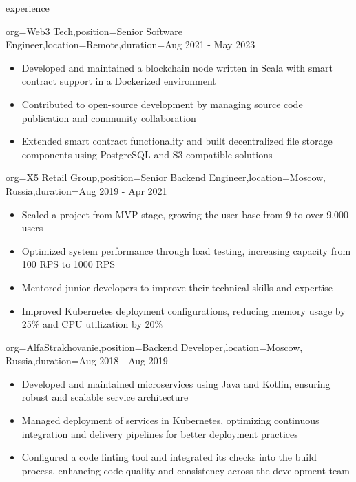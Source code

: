 \documentclass{resume}
\begin{document}
\begin{ResumeSection}{experience}
    \begin{ResumeSubsection}{org=Web3 Tech,position=Senior Software Engineer,location=Remote,duration=Aug 2021 - May 2023}
    \begin{itemize}
        \item Developed and maintained a blockchain node written in Scala with smart contract support in a Dockerized environment
        \item Contributed to open-source development by managing source code publication and community collaboration
        \item Extended smart contract functionality and built decentralized file storage components using PostgreSQL and S3-compatible solutions
    \end{itemize}
\end{ResumeSubsection}

\begin{ResumeSubsection}{org=X5 Retail Group,position=Senior Backend Engineer,location={Moscow, Russia},duration=Aug 2019 - Apr 2021}
    \begin{itemize}
        \item Scaled a project from MVP stage, growing the user base from 9 to over 9,000 users
        \item Optimized system performance through load testing, increasing capacity from 100 RPS to 1000 RPS
        \item Mentored junior developers to improve their technical skills and expertise
        \item Improved Kubernetes deployment configurations, reducing memory usage by 25\% and CPU utilization by 20\%
    \end{itemize}
\end{ResumeSubsection}

    \begin{ResumeSubsection}{org=AlfaStrakhovanie,position=Backend Developer,location={Moscow, Russia},duration=Aug 2018 - Aug 2019}
        \begin{itemize}
            \item Developed and maintained microservices using Java and Kotlin, ensuring robust and scalable service architecture
            \item Managed deployment of services in Kubernetes, optimizing continuous integration and delivery pipelines for better deployment practices
            \item Configured a code linting tool and integrated its checks into the build process, enhancing code quality and consistency across the development team
        \end{itemize}
    \end{ResumeSubsection}


\end{ResumeSection}
\end{document}
